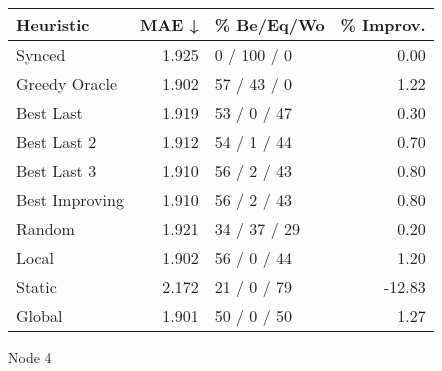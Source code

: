 \begin{tabular}{lrlr}
\toprule
\textbf{Heuristic} & \textbf{MAE ↓} & \textbf{\% Be/Eq/Wo} & \textbf{\% Improv.} \\
\midrule
            Synced &          1.925 &          0 / 100 / 0 &                0.00 \\
     Greedy Oracle &          1.902 &          57 / 43 / 0 &                1.22 \\
         Best Last &          1.919 &          53 / 0 / 47 &                0.30 \\
       Best Last 2 &          1.912 &          54 / 1 / 44 &                0.70 \\
       Best Last 3 &          1.910 &          56 / 2 / 43 &                0.80 \\
    Best Improving &          1.910 &          56 / 2 / 43 &                0.80 \\
            Random &          1.921 &         34 / 37 / 29 &                0.20 \\
             Local &          1.902 &          56 / 0 / 44 &                1.20 \\
            Static &          2.172 &          21 / 0 / 79 &              -12.83 \\
            Global &          1.901 &          50 / 0 / 50 &                1.27 \\
\bottomrule
\end{tabular}
\caption{Node 4}
\label{tab:ds_iid_lr01_le2_bs4_4}
